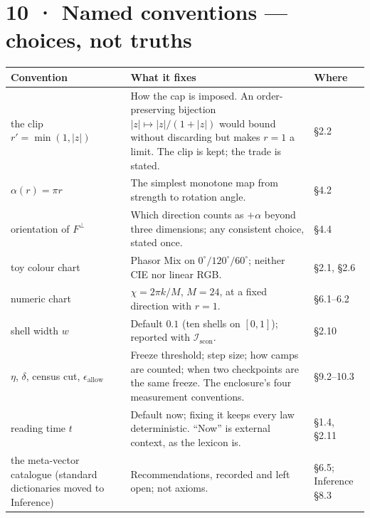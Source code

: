 \documentclass[10.5pt]{article}
\begin{document}
\section*{10 · Named conventions — choices, not truths}
{\small\setlength{\tabcolsep}{4pt}\begin{longtable}{L{4.0cm}L{10.2cm}L{2.1cm}}
\toprule
\textbf{Convention} & \textbf{What it fixes} & \textbf{Where} \\
\midrule
\endhead
the clip $r'=\min(1,\lvert z\rvert)$ & How the cap is imposed. An order-preserving bijection $\lvert z\rvert\mapsto\lvert z\rvert/(1+\lvert z\rvert)$ would bound without discarding but makes $r=1$ a limit. The clip is kept; the trade is stated. & §2.2 \\
$\alpha(r)=\pi r$ & The simplest monotone map from strength to rotation angle. & §4.2 \\
orientation of $F^\perp$ & Which direction counts as $+\alpha$ beyond three dimensions; any consistent choice, stated once. & §4.4 \\
toy colour chart & Phasor Mix on $0^\circ/120^\circ/60^\circ$; neither CIE nor linear RGB. & §2.1, §2.6 \\
numeric chart & $\chi=2\pi k/M$, $M=24$, at a fixed direction with $r=1$. & §6.1–6.2 \\
shell width $w$ & Default $0.1$ (ten shells on $[0,1]$); reported with $\mathcal{I}_{\mathrm{scon}}$. & §2.10 \\
$\eta$, $\delta$, census cut, $\epsilon_{\text{allow}}$ & Freeze threshold; step size; how camps are counted; when two checkpoints are the same freeze. The enclosure's four measurement conventions. & §9.2–10.3 \\
reading time $t$ & Default now; fixing it keeps every law deterministic. “Now” is external context, as the lexicon is. & §1.4, §2.11 \\
the meta-vector catalogue (standard dictionaries moved to Inference) & Recommendations, recorded and left open; not axioms. & §6.5; Inference §8.3 \\
\bottomrule
\end{longtable}}
\end{document}
